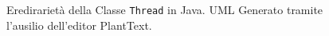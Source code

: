 \begin{figure}[H]
    \centering
    
    \caption[Eredirarietà della Classe \texttt{Thread}]{Eredirarietà della Classe \texttt{Thread} in Java. UML Generato tramite l'ausilio dell'editor PlantText\cite{PlantText}.}
    \label{fig:ThreadInheritance}
\end{figure}